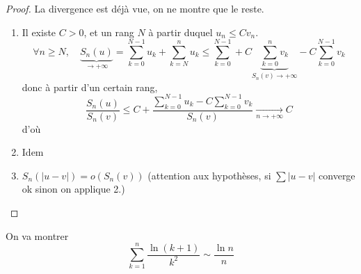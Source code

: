\begin{proof}
    La divergence est déjà vue, on ne montre que le reste.
    \begin{enumerate}
        \item Il existe $C>0$, et un rang $N$ à partir duquel $u_n\leq Cv_n$. \[
                \forall n\geq N, \quad \underbrace{S_n(u)}_{\longrightarrow+\infty}=\sum_{k=0}^{N-1}u_k+\sum_{k=N}^nu_k\leq \sum_{k=0}^{N-1}+C\underbrace{\sum_{k=0}^nv_k}_{S_n(v)\longrightarrow+\infty}-C\sum_{k=0}^{N-1}v_k
            \]
            donc à partir d'un certain rang, \[
                \frac{S_n(u)}{S_n(v)}\leq C+\frac{\sum_{k=0}^{N-1}u_k-C\sum_{k=0}^{N-1}v_k}{S_n(v)}\xrightarrow[n\to+\infty]{}C
            \]
            d'où \conc
        \item Idem
        \item $S_n(|u-v|)=o(S_n(v))$ (attention aux hypothèses, si $\sum |u-v|$ converge ok sinon on applique 2.)
    \end{enumerate}
\end{proof}

\begin{ex}
    On va montrer \[
        \sum_{k=1}^n\frac{\ln(k+1)}{k^2}\sim\frac{\ln n}n
    \]
\end{ex}

